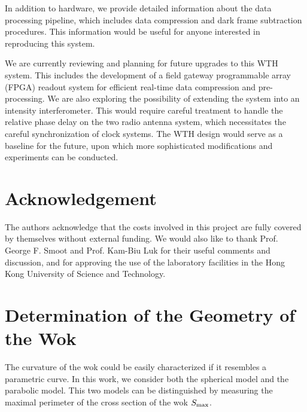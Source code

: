 \documentclass[12pt]{article}
\begin{document}
    In addition to hardware, we provide detailed information about the data processing pipeline, which includes data compression and dark frame subtraction procedures. This information would be useful for anyone interested in reproducing this system.
    
    We are currently reviewing and planning for future upgrades to this WTH system. This includes the development of a field gateway programmable array (FPGA) readout system for efficient real-time data compression and pre-processing.
    We are also exploring the possibility of extending the system into an intensity interferometer. 
    This would require careful treatment to handle the relative phase delay on the two radio antenna system, which necessitates the careful synchronization of clock systems. 
    The WTH design would serve as a baseline for the future, upon which more sophisticated modifications and experiments can be conducted.

    \section*{Acknowledgement}
    The authors acknowledge that the costs involved in this project are fully covered by themselves without external funding. We would also like to thank Prof. George F. Smoot and Prof. Kam-Biu Luk for their useful comments and discussion, and for approving the use of the laboratory facilities in the Hong Kong University of Science and Technology.
    
    \appendix
    \section{Determination of the Geometry of the Wok} \label{app: wok-geometry}
    The curvature of the wok could be easily characterized if it resembles a parametric curve.
    In this work, we consider both the spherical model and the parabolic model.
    This two models can be distinguished by measuring the maximal perimeter of the cross section of the wok $S_{\rm max}$. 
    
\end{document}
